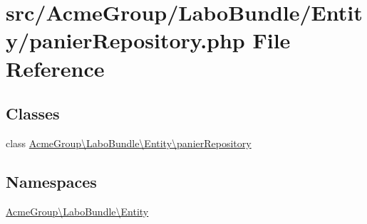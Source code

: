 \hypertarget{panier_repository_8php}{\section{src/\+Acme\+Group/\+Labo\+Bundle/\+Entity/panier\+Repository.php File Reference}
\label{panier_repository_8php}
}
\subsection*{Classes}
\begin{DoxyCompactItemize}
\item 
class \hyperlink{class_acme_group_1_1_labo_bundle_1_1_entity_1_1panier_repository}{Acme\+Group\textbackslash{}\+Labo\+Bundle\textbackslash{}\+Entity\textbackslash{}panier\+Repository}
\end{DoxyCompactItemize}
\subsection*{Namespaces}
\begin{DoxyCompactItemize}
\item 
 \hyperlink{namespace_acme_group_1_1_labo_bundle_1_1_entity}{Acme\+Group\textbackslash{}\+Labo\+Bundle\textbackslash{}\+Entity}
\end{DoxyCompactItemize}
